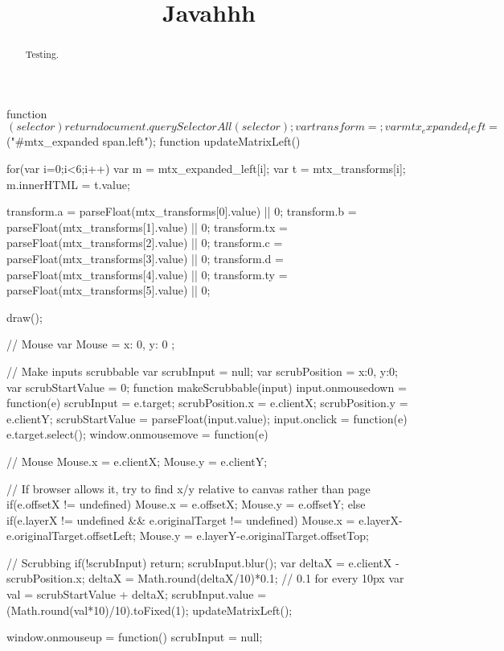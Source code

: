\documentclass{ximera}
\title{Javahhh}
\begin{document}
\begin{abstract}
  Testing.
\end{abstract}
\maketitle

\begin{javascript}
function $(selector){
	return document.querySelectorAll(selector);
}

var transform = {};
var mtx_expanded_left = $("#mtx_expanded span.left");
function updateMatrixLeft(){

	for(var i=0;i<6;i++){
		var m = mtx_expanded_left[i];
		var t = mtx_transforms[i];
		m.innerHTML = t.value;
	}

	transform.a = parseFloat(mtx_transforms[0].value) || 0;
	transform.b = parseFloat(mtx_transforms[1].value) || 0;
	transform.tx = parseFloat(mtx_transforms[2].value) || 0;
	transform.c = parseFloat(mtx_transforms[3].value) || 0;
	transform.d = parseFloat(mtx_transforms[4].value) || 0;
	transform.ty = parseFloat(mtx_transforms[5].value) || 0;

	draw();

}

// Mouse
var Mouse = {
	x: 0,
	y: 0
};

// Make inputs scrubbable
var scrubInput = null;
var scrubPosition = {x:0, y:0};
var scrubStartValue = 0;
function makeScrubbable(input){
	input.onmousedown = function(e){
		scrubInput = e.target;
		scrubPosition.x = e.clientX;
		scrubPosition.y = e.clientY;
		scrubStartValue = parseFloat(input.value);
	}
	input.onclick = function(e){
		e.target.select();
	}
}
window.onmousemove = function(e){
	// Mouse
	Mouse.x = e.clientX;
	Mouse.y = e.clientY;

	// If browser allows it, try to find x/y relative to canvas rather than page
	if(e.offsetX != undefined){
		Mouse.x = e.offsetX;
		Mouse.y = e.offsetY;
	}
	else if(e.layerX != undefined && e.originalTarget != undefined){
		Mouse.x = e.layerX-e.originalTarget.offsetLeft;
		Mouse.y = e.layerY-e.originalTarget.offsetTop;
	}

	// Scrubbing
	if(!scrubInput) return;
	scrubInput.blur();
	var deltaX = e.clientX - scrubPosition.x;
	deltaX = Math.round(deltaX/10)*0.1; // 0.1 for every 10px
	var val = scrubStartValue + deltaX;
	scrubInput.value = (Math.round(val*10)/10).toFixed(1);
	updateMatrixLeft();

}
window.onmouseup = function(){
	scrubInput = null;
}


\end{javascript}
\end{document}
